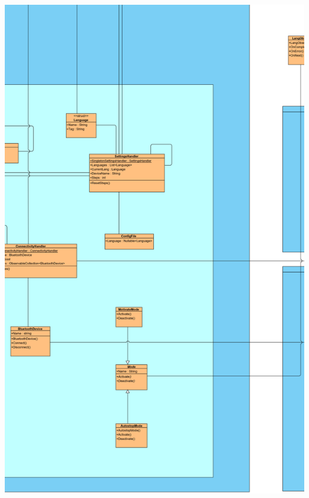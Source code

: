 \documentclass[../entwurf.tex]{subfiles}
\begin{document}
\includegraphics[scale=0.12]{../graphics/uml_diagramme/Gesamt/6.png}
\newpage
\end{document}
